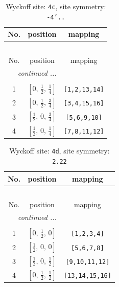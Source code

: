 \documentclass[fleqn,8pt]{jsarticle}
\begin{document}
\renewcommand{\arraystretch}{1.2}
\begin{longtable}{ccc}
\caption{Wyckoff site: {\tt 4c}, site symmetry: {\tt -4'..}}
 \\
 \hline \hline
No. & position & mapping \\ \hline \endfirsthead

\multicolumn{2}{l}{\tablename\ \thetable{}} \\
 \hline \hline
No. & position & mapping \\ \hline \endhead

 \hline \hline
\multicolumn{2}{r}{\footnotesize\it continued ...} \\ \endfoot

 \hline \hline
\multicolumn{2}{r}{} \\ \endlastfoot

1 & $\left[ 0,\, \frac{1}{2},\, \frac{1}{4} \right]$ & {\tt [1,2,13,14]} \\ \hline
2 & $\left[ 0,\, \frac{1}{2},\, \frac{3}{4} \right]$ & {\tt [3,4,15,16]} \\ \hline
3 & $\left[ \frac{1}{2},\, 0,\, \frac{3}{4} \right]$ & {\tt [5,6,9,10]} \\ \hline
4 & $\left[ \frac{1}{2},\, 0,\, \frac{1}{4} \right]$ & {\tt [7,8,11,12]} \\
\end{longtable}
\renewcommand{\arraystretch}{1.2}
\begin{longtable}{ccc}
\caption{Wyckoff site: {\tt 4d}, site symmetry: {\tt 2.22}}
 \\
 \hline \hline
No. & position & mapping \\ \hline \endfirsthead

\multicolumn{2}{l}{\tablename\ \thetable{}} \\
 \hline \hline
No. & position & mapping \\ \hline \endhead

 \hline \hline
\multicolumn{2}{r}{\footnotesize\it continued ...} \\ \endfoot

 \hline \hline
\multicolumn{2}{r}{} \\ \endlastfoot

1 & $\left[ 0,\, \frac{1}{2},\, 0 \right]$ & {\tt [1,2,3,4]} \\ \hline
2 & $\left[ \frac{1}{2},\, 0,\, 0 \right]$ & {\tt [5,6,7,8]} \\ \hline
3 & $\left[ \frac{1}{2},\, 0,\, \frac{1}{2} \right]$ & {\tt [9,10,11,12]} \\ \hline
4 & $\left[ 0,\, \frac{1}{2},\, \frac{1}{2} \right]$ & {\tt [13,14,15,16]} \\
\end{longtable}
\end{document}

